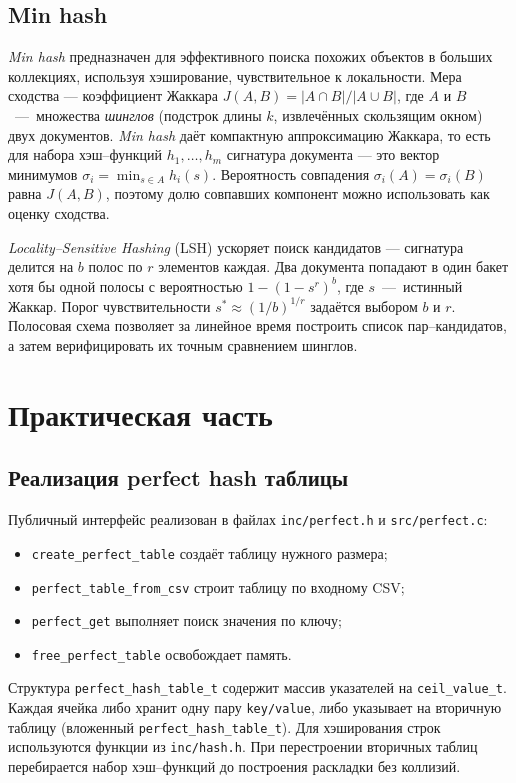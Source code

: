 \documentclass{itmo}
\begin{document}
\section{Min hash}

\textit{Min hash} предназначен для эффективного поиска похожих объектов в больших коллекциях, используя хэширование, чувствительное к локальности.
Мера сходства --- коэффициент Жаккара $J(A,B) = |A \cap B| / |A \cup B|$, где $A$ и $B$~---~множества \textit{шинглов} (подстрок длины $k$, извлечённых скользящим окном) двух документов.
\textit{Min hash} даёт компактную аппроксимацию Жаккара, то есть для набора хэш--функций $h_1,\ldots,h_m$ сигнатура документа --- это вектор минимумов $\sigma_i = \min_{s \in A} h_i(s)$.
Вероятность совпадения $\sigma_i(A) = \sigma_i(B)$ равна $J(A,B)$, поэтому долю совпавших компонент можно использовать как оценку сходства.

\textit{Locality--Sensitive Hashing} (LSH) ускоряет поиск кандидатов --- сигнатура делится на $b$ полос по $r$ элементов каждая.
Два документа попадают в один бакет хотя бы одной полосы с вероятностью $1 - (1 - s^r)^b$, где $s$~---~истинный Жаккар.
Порог чувствительности $s^* \approx (1/b)^{1/r}$ задаётся выбором $b$ и $r$.
Полосовая схема позволяет за линейное время построить список пар--кандидатов, а затем верифицировать их точным сравнением шинглов.

\chapter{Практическая часть}

\section{Реализация perfect hash таблицы}

Публичный интерфейс реализован в файлах \texttt{inc/perfect.h} и \texttt{src/perfect.c}:
\begin{itemize}
	\item \texttt{create\_perfect\_table} создаёт таблицу нужного размера;
	\item \texttt{perfect\_table\_from\_csv} строит таблицу по входному CSV;
	\item \texttt{perfect\_get} выполняет поиск значения по ключу;
	\item \texttt{free\_perfect\_table} освобождает память.
\end{itemize}

Структура \texttt{perfect\_hash\_table\_t} содержит массив указателей на \texttt{ceil\_value\_t}.
Каждая ячейка либо хранит одну пару \texttt{key/value}, либо указывает на вторичную таблицу (вложенный \texttt{perfect\_hash\_table\_t}).
Для хэширования строк используются функции из \texttt{inc/hash.h}.
При перестроении вторичных таблиц перебирается набор хэш--функций до построения раскладки без коллизий.
\end{document}
